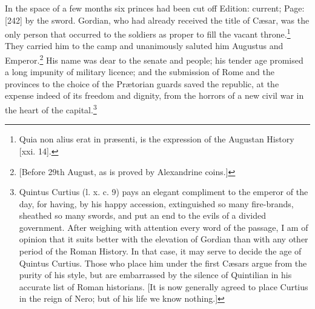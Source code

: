 In the space of a few months six princes had been cut off Edition: current; Page: [242] by the sword. Gordian, who had already received the title of Cæsar, was the only person that occurred to the soldiers as proper to fill the vacant throne.\footnote{Quia non alius erat in præsenti, is the expression of the Augustan History [xxi. 14].} They carried him to the camp and unanimously saluted him Augustus and Emperor.\footnote{[Before 29th August, as is proved by Alexandrine coins.]} His name was dear to the senate and people; his tender age promised a long impunity of military licence; and the submission of Rome and the provinces to the choice of the Prætorian guards saved the republic, at the expense indeed of its freedom and dignity, from the horrors of a new civil war in the heart of the capital.\footnote{Quintus Curtius (l. x. c. 9) pays an elegant compliment to the emperor of the day, for having, by his happy accession, extinguished so many fire-brands, sheathed so many swords, and put an end to the evils of a divided government. After weighing with attention every word of the passage, I am of opinion that it suits better with the elevation of Gordian than with any other period of the Roman History. In that case, it may serve to decide the age of Quintus Curtius. Those who place him under the first Cæsars argue from the purity of his style, but are embarrassed by the silence of Quintilian in his accurate list of Roman historians. [It is now generally agreed to place Curtius in the reign of Nero; but of his life we know nothing.]}

